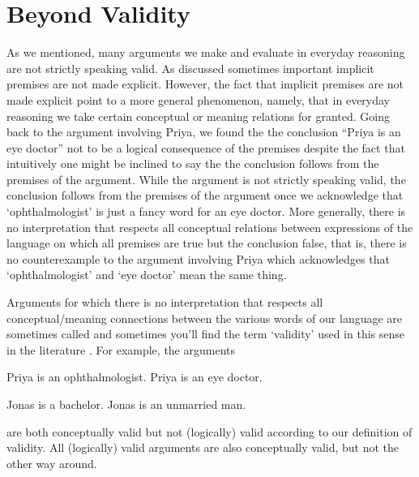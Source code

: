 \section{Beyond Validity}
As we mentioned, many arguments we make and evaluate in everyday reasoning are not strictly speaking valid. As discussed sometimes important implicit premises are not made explicit. However, the fact that implicit premises are not made explicit point to a more general phenomenon, namely, that in everyday reasoning we take certain conceptual or meaning relations for granted. Going back to the argument involving Priya, we found the the conclusion ``Priya is an eye doctor'' not to be a logical consequence of the premises despite the fact that intuitively one might be inclined to say the the conclusion follows from the premises of the argument. While the argument is not strictly speaking valid, the conclusion follows from the premises of the argument once we acknowledge that `ophthalmologist' is just a fancy word for an eye doctor. More generally, there is no interpretation that respects all conceptual relations between expressions of the language on which all premises are true but the conclusion false, that is, there is no counterexample to the argument involving Priya which acknowledges that `ophthalmologist' and `eye doctor' mean the same thing.

Arguments for which there is no interpretation that respects all conceptual/meaning connections between the various words of our language are sometimes called  and sometimes you'll find the term `validity' used in this sense in the literature . For example, the arguments

\begin{earg}
		\prem Priya is an ophthalmologist.
		\conc Priya is an eye doctor.
	\end{earg}

	\begin{earg}
		\prem Jonas is a bachelor.
		\conc Jonas is an unmarried man.
	\end{earg}

	are both conceptually valid but not (logically) valid according to our definition of validity. All (logically) valid arguments are also conceptually valid, but not the other way around.

